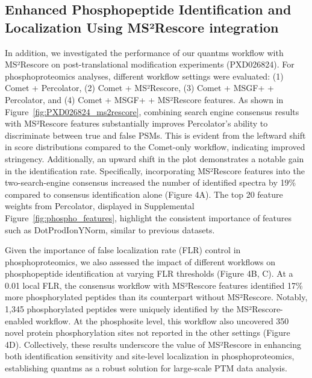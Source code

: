 \documentclass[12pt]{article}
\begin{document}
\subsection{Enhanced Phosphopeptide Identification and Localization Using MS²Rescore integration}
In addition, we investigated the performance of our quantms workflow with MS²Rescore on post-translational modification experiments (PXD026824). For phosphoproteomics analyses, different workflow settings were evaluated: (1) Comet + Percolator, (2) Comet + MS²Rescore, (3) Comet + MSGF+ + Percolator, and (4) Comet + MSGF+ + MS²Rescore features. As shown in Figure~\ref{fig:PXD026824_ms2rescore}, combining search engine consensus results with MS²Rescore features substantially improves Percolator's ability to discriminate between true and false PSMs. This is evident from the leftward shift in score distributions compared to the Comet-only workflow, indicating improved stringency. Additionally, an upward shift in the plot demonstrates a notable gain in the identification rate. Specifically, incorporating MS²Rescore features into the two-search-engine consensus increased the number of identified spectra by 19\% compared to consensus identification alone (Figure 4A). The top 20 feature weights from Percolator, displayed in Supplemental Figure~\ref{fig:phospho_features}, highlight the consistent importance of features such as DotProdIonYNorm, similar to previous datasets.

Given the importance of false localization rate (FLR) control in phosphoproteomics, we also assessed the impact of different workflows on phosphopeptide identification at varying FLR thresholds (Figure 4B, C). At a 0.01 local FLR, the consensus workflow with MS²Rescore features identified 17\% more phosphorylated peptides than its counterpart without MS²Rescore. Notably, 1,345 phosphorylated peptides were uniquely identified by the MS²Rescore-enabled workflow. At the phosphosite level, this workflow also uncovered 350 novel protein phosphorylation sites not reported in the other settings (Figure 4D). Collectively, these results underscore the value of MS²Rescore in enhancing both identification sensitivity and site-level localization in phosphoproteomics, establishing quantms as a robust solution for large-scale PTM data analysis.
\end{document}
